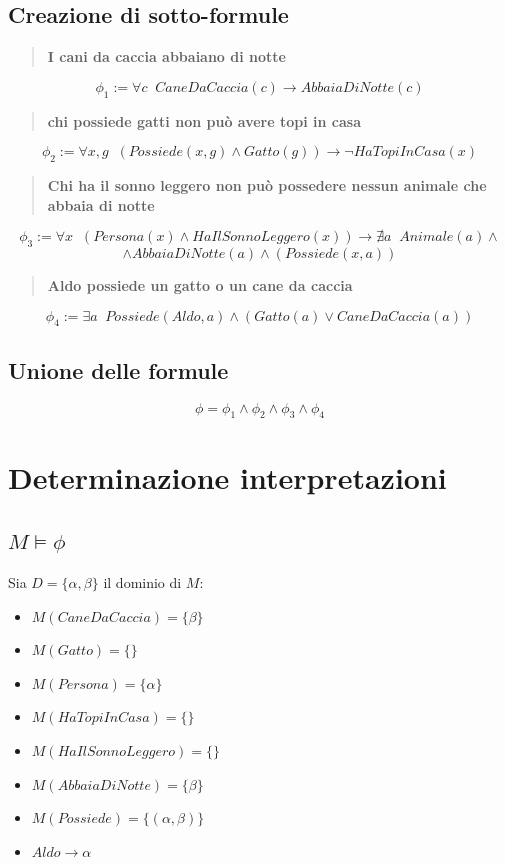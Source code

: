 \documentclass[a4paper, 12pt]{article}
\begin{document}
\subsection{Creazione di sotto-formule}
\begin{quote}
    \textbf{I cani da caccia abbaiano di notte}
\end{quote}
\[\phi_1 := \forall c \;\; CaneDaCaccia(c) \rightarrow AbbaiaDiNotte(c)\]
\begin{quote}
    \textbf{chi possiede gatti non può avere topi in casa}
\end{quote}
\[\phi_2 := \forall x,g\;\; (Possiede(x, g) \land Gatto(g)) \rightarrow \lnot HaTopiInCasa(x) \]
\begin{quote}
    \textbf{Chi ha il sonno leggero non può possedere nessun animale che abbaia di notte}
\end{quote}
\[ \phi_3 := \forall x \;\; (Persona(x) \land HaIlSonnoLeggero(x))\rightarrow \nexists a \;\; Animale(a) \land \]
\[\land AbbaiaDiNotte(a) \land (Possiede(x, a))\]
\begin{quote}
    \textbf{Aldo possiede un gatto o un cane da caccia}
\end{quote}
\[ \phi_4 := \exists a\;\; Possiede(Aldo, a) \land (Gatto(a) \lor CaneDaCaccia(a))\]
\subsection{Unione delle formule}
\[ \phi = \phi_1 \land \phi_2 \land \phi_3 \land \phi_4 \]
\section{Determinazione interpretazioni}
\subsection{$ M \models \phi $}

Sia $D = \{\alpha, \beta \}$ il dominio di $M$:
\begin{itemize}[label=-]
    \item $ M(CaneDaCaccia) = \{ \beta \} $
    \item $ M(Gatto) = \{ \} $
    \item $ M(Persona) = \{ \alpha \} $
    \item $ M(HaTopiInCasa) = \{\} $
    \item $ M(HaIlSonnoLeggero) = \{\} $
    \item $ M(AbbaiaDiNotte) = \{ \beta \} $
    \item $ M(Possiede) = \{(\alpha, \beta)\} $
    \item $ Aldo \rightarrow \alpha $
\end{itemize}
\end{document}
